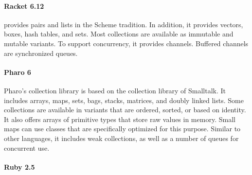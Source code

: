 \documentclass[sigconf, 10pt]{acmart}
\begin{document}

\paragraph{Racket 6.12}

 provides pairs and lists in the Scheme tradition.
In addition, it provides vectors, boxes, hash tables, and sets.
Most collections are available as immutable and mutable variants.
To support concurrency, it provides channels.
Buffered channels are synchronized queues.

\paragraph{Pharo 6}
Pharo's collection library is based on the collection library
of Smalltalk\citep{Smalltalk80,Cook:1992:ISS}.
It includes arrays, maps, sets, bags, stacks, matrices, and doubly linked lists.
Some collections are available in variants that are ordered, sorted,
or based on identity.
It also offers arrays of primitive types that store raw values in memory.
Small maps can use classes that are specifically optimized for this purpose.
Similar to other languages,
it includes weak collections, as well as a number of queues for concurrent use.

\paragraph{Ruby 2.5}
\end{document}
